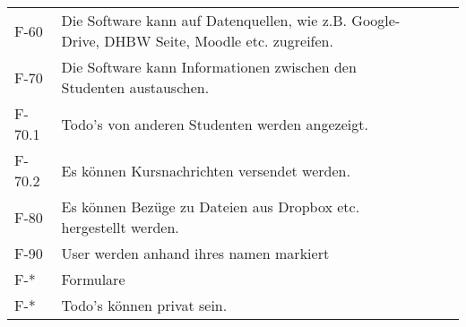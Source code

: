 \begin{tabularx}{\textwidth}{|l|X|l|l|}
    F-60 & Die Software kann auf Datenquellen, wie z.B. Google-Drive, DHBW Seite, Moodle etc. zugreifen. & & \\

    F-70 & Die Software kann Informationen zwischen den Studenten austauschen. & & \\
    F-70.1 & Todo's von anderen Studenten werden angezeigt. & &\\
    F-70.2 & Es können Kursnachrichten versendet werden. & &\\
    F-80 & Es können Bezüge zu Dateien aus Dropbox etc. hergestellt werden. & &\\
    F-90 & User werden anhand ihres namen markiert & &\\ %

    F-* & Formulare & &\\

    F-* & Todo's können privat sein. & & \\

    





    \bottomrule
\end{tabularx}




